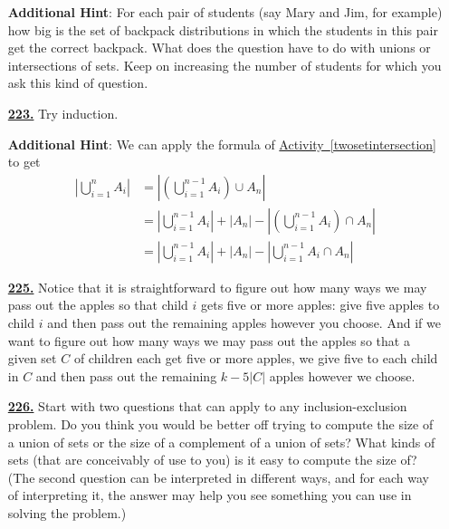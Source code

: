 \documentclass[10pt,]{book}
\theoremstyle{plain}
\theoremstyle{definition}
\theoremstyle{definition}
\theoremstyle{definition}
\numberwithin{equation}{chapter}
\newcommand{\amp}{&}
\begin{document}
\begin{itemize}[itemsep=1em]
\par\smallskip
\noindent\textbf{Additional Hint}: \hypertarget{p-1191}{}%
For each pair of students (say Mary and Jim, for example) how big is the set of backpack distributions in which the students in this pair get the correct backpack. What does the question have to do with unions or intersections of sets. Keep on increasing the number of students for which you ask this kind of question.%

\hypertarget{a-223}{}\item[\textbf{\hyperref[activity-216]{223.}}]
\hypertarget{p-1202}{}%
Try induction.%

\par\smallskip
\noindent\textbf{Additional Hint}: \hypertarget{p-1203}{}%
We can apply the formula of \hyperref[twosetintersection]{Activity~\ref{twosetintersection}} to get%
\begin{align*}
\left|\bigcup_{i=1}^n A_i \right| \amp = \left|\left(\bigcup_{i=1}^{n-1} A_i\right) \cup A_n \right| \\
\amp = \left| \bigcup_{i=1}^{n-1} A_i\right| + |A_n| - \left|\left( \bigcup_{i=1}^{n-1} A_i\right) \cap A_n\right|\\
\amp = \left| \bigcup_{i=1}^{n-1} A_i\right| + |A_n| - \left|\bigcup_{i=1}^{n-1} A_i \cap A_n\right|
\end{align*}
%

\hypertarget{a-225}{}\item[\textbf{\hyperref[act_restrictedmultisetspie]{225.}}]
\hypertarget{p-1209}{}%
Notice that it is straightforward to figure out how many ways we may pass out the apples so that child \(i\) gets five or more apples: give five apples to child \(i\) and then pass out the remaining apples however you choose. And if  we want to figure out how many ways we may pass out the apples so that a given set \(C\) of children each get five or more apples, we give five to each child in \(C\) and then pass out the remaining \(k-5|C|\) apples however we choose.%

\hypertarget{a-226}{}\item[\textbf{\hyperref[relaxedmenage]{226.}}]
\hypertarget{p-1212}{}%
Start with two questions that can apply to any inclusion-exclusion problem. Do you think you would be better off trying to compute the size of a union of sets or the size of a complement of a union of sets? What kinds of sets (that are conceivably of use to you) is it easy to compute the size of? (The second question can be interpreted in different ways, and for each way of interpreting it, the answer may help you see something you can use in solving the problem.)%


\end{itemize}
\end{document}
